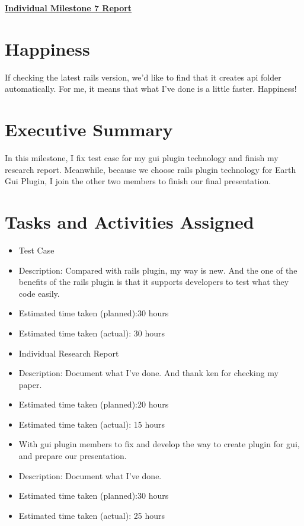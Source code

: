 \documentclass{article}
\begin{document}
\pagestyle{headings}

\begin{center}
{\LARGE\textbf{\underline{{Individual Milestone 7 Report}}}}
\end{center}

\section*{Happiness}
If checking the latest rails version, we'd like to find that it creates api folder automatically. For me, it means that what I've done is a little faster. Happiness!

\section*{Executive Summary}
In this milestone, I fix test case for my gui plugin technology and finish my research report. Meanwhile, because we choose rails plugin technology for Earth Gui Plugin, I join the other two members to finish our final presentation.

\section*{Tasks and Activities Assigned}

\begin{itemize}
	\item Test Case
	\item Description: Compared with rails plugin, my way is new. And the one of the benefits of the rails plugin is that it supports developers to test what they code easily.
	\item Estimated time taken (planned):30 hours
	\item Estimated time taken (actual): 30 hours
\end{itemize}

\begin{itemize}
	\item Individual Research Report
	\item Description: Document what I've done. And thank ken for checking my paper.
	\item Estimated time taken (planned):20 hours
	\item Estimated time taken (actual): 15 hours
\end{itemize}

\begin{itemize}
	\item With gui plugin members to fix and develop the way to create plugin for gui, and prepare our presentation. 
	\item Description: Document what I've done.
	\item Estimated time taken (planned):30 hours
	\item Estimated time taken (actual): 25 hours
\end{itemize}
\end{document}
